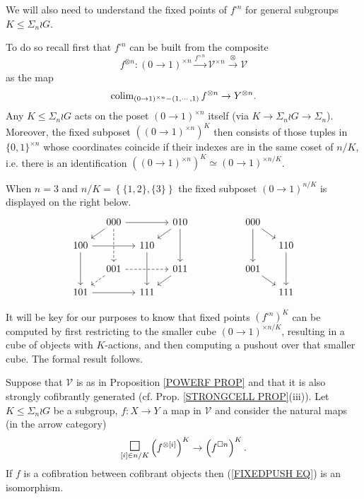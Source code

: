 \documentclass[a4paper,10pt]{article}%
\begin{document}
We will also need to understand the fixed points of $f^{\square n}$ for general subgroups $K \leq \Sigma_n \wr G$.

To do so recall first that $f^{\square n}$ can be built 
from the composite 
\[
f^{\otimes n} \colon 
(0\to 1)^{\times n}
	\xrightarrow{f^{\times n}}
\mathcal{V}^{\times n}
	\xrightarrow{\otimes}
\mathcal{V}
\]
as the map
\[
\operatorname{colim}_{(0 \to 1)^{\times n} - (1,\cdots,1)} f^{\otimes n}
	\to 
Y^{\otimes n}.
\]
Any $K \leq \Sigma_n \wr G$ acts on the poset 
$(0 \to 1)^{\times n}$ itself 
(via $K \to \Sigma_n \wr G \to \Sigma_n$).
Moreover, the fixed subposet  
$\left((0 \to 1)^{\times n}\right)^K$
then consists of those tuples in $\{0,1\}^{\times n}$
whose coordinates coincide if their indexes are in the same coset of $n/K$, i.e. there is an identification
$\left((0 \to 1)^{\times n}\right)^K \simeq (0 \to 1)^{\times n/K}$.



\begin{example}
When $n=3$ and $n/K = \left\{\{1,2\},\{3\}\right\}$ the fixed subposet $(0 \to 1)^{n/K}$ is displayed on the right below.
\[
\begin{tikzcd}[column sep=1em, row sep=1em]
	& 000 \ar{rr} \ar{ld} \ar[dashed]{dd} && 010 \ar{ld} \ar{dd}&
	&&&& 000 \ar{dd} \ar{rd}
\\
	100 \ar{rr} \ar{dd} && 110 \ar{dd}&&
	&&&& & 110 \ar{dd}
\\
	& 001 \ar[dashed]{rr} \ar[dashed]{ld} && 011 \ar{ld}&
	&&&& 001 \ar{rd}
\\
	101 \ar{rr} && 111 &&
	&&&& & 111
\end{tikzcd}
\]
\end{example}


It will be key for our purposes to know that fixed points 
$\left( f^{\square n} \right)^K$ can be computed by first restricting to the smaller cube 
$(0 \to 1)^{\times n/K}$,
resulting in a cube of objects with $K$-actions,
and then computing a pushout over that smaller cube.
The formal result follows.



\begin{proposition}
	Suppose that $\mathcal{V}$ is as in Proposition \ref{POWERF PROP} and that it is also strongly cofibrantly generated (cf. Prop. \ref{STRONGCELL PROP}(iii)).
	Let $K \leq \Sigma_n \wr G$ be a subgroup, 
	$f \colon X \to Y$ a map in $\mathcal{V}$ and consider the natural maps (in the arrow category)
\begin{equation}\label{FIXEDPUSH EQ}
	\underset{[i] \in n/K}{\mathlarger{\mathlarger{\square}}}
	\left( f^{\otimes [i]} \right)^K
\to
	\left( f^{\square n} \right)^K.
\end{equation}
If $f$ is a cofibration between cofibrant objects then 
(\ref{FIXEDPUSH EQ}) is an isomorphism.
\end{proposition}
\end{document}
